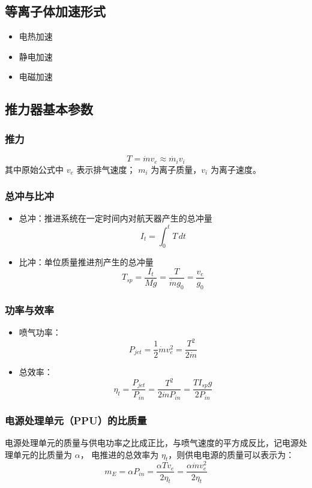 \subsection{等离子体加速形式}

\begin{itemize}
    \item 电热加速
    \item 静电加速
    \item 电磁加速
\end{itemize}

\subsection{推力器基本参数}

\subsubsection{推力}
\[
    T = \dot{m} v_e \approx \dot{m_i} v_i
\]
其中原始公式中 $v_e$ 表示排气速度； $m_i$ 为离子质量，$v_i$ 为离子速度。

\subsubsection{总冲与比冲}

\begin{itemize}
    \item 总冲：推进系统在一定时间内对航天器产生的总冲量
    \[
        I_t = \int_0^t T \, dt
    \]
    \item 比冲：单位质量推进剂产生的总冲量
    \[
        T_{sp} = \frac{I_t}{Mg} = \frac{T}{\dot{m} g_0} = \frac{v_e}{g_0}
    \]
\end{itemize}

\subsubsection{功率与效率}

\begin{itemize}
    \item 喷气功率：
    \[
        P_{jet} = \frac{1}{2} \dot{m} v_e^2 = \frac{T^2}{2\dot{m}}
    \]
    \item 总效率：
    \[
        \eta_t = \frac{P_{jet}}{P_{in}} =
                 \frac{T^2}{2\dot{m} P_{in}} = 
                 \frac{T I_{sp} g}{2P_{in}}
    \]
\end{itemize}

\subsubsection{电源处理单元（PPU）的比质量}

电源处理单元的质量与供电功率之比成正比，与喷气速度的平方成反比，记电源处理单元的比质量为 $\alpha$， 电推进的总效率为 $\eta_t$，则供电电源的质量可以表示为：
\[
    m_E = \alpha P_{in} = \frac{\alpha T v_e }{2 \eta_t} = \frac{\alpha \dot{m} v_e^2 }{2 \eta_t}
\]
